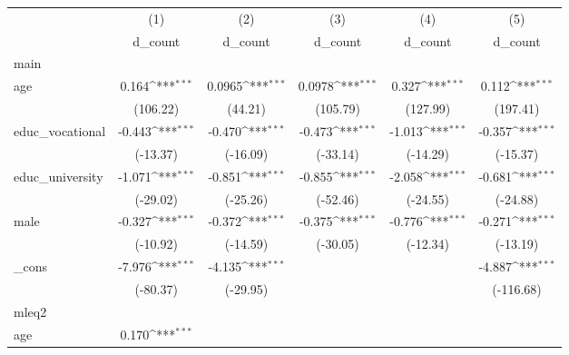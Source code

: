 {
\def\sym#1{\ifmmode^{#1}\else\(^{#1}\)\fi}
\begin{tabular}{l*{5}{c}}
\hline\hline
            &\multicolumn{1}{c}{(1)}&\multicolumn{1}{c}{(2)}&\multicolumn{1}{c}{(3)}&\multicolumn{1}{c}{(4)}&\multicolumn{1}{c}{(5)}\\
            &\multicolumn{1}{c}{d\_count}&\multicolumn{1}{c}{d\_count}&\multicolumn{1}{c}{d\_count}&\multicolumn{1}{c}{d\_count}&\multicolumn{1}{c}{d\_count}\\
\hline
main        &                     &                     &                     &                     &                     \\
age         &       0.164\sym{***}&      0.0965\sym{***}&      0.0978\sym{***}&       0.327\sym{***}&       0.112\sym{***}\\
            &    (106.22)         &     (44.21)         &    (105.79)         &    (127.99)         &    (197.41)         \\
[1em]
educ\_vocational&      -0.443\sym{***}&      -0.470\sym{***}&      -0.473\sym{***}&      -1.013\sym{***}&      -0.357\sym{***}\\
            &    (-13.37)         &    (-16.09)         &    (-33.14)         &    (-14.29)         &    (-15.37)         \\
[1em]
educ\_university&      -1.071\sym{***}&      -0.851\sym{***}&      -0.855\sym{***}&      -2.058\sym{***}&      -0.681\sym{***}\\
            &    (-29.02)         &    (-25.26)         &    (-52.46)         &    (-24.55)         &    (-24.88)         \\
[1em]
male        &      -0.327\sym{***}&      -0.372\sym{***}&      -0.375\sym{***}&      -0.776\sym{***}&      -0.271\sym{***}\\
            &    (-10.92)         &    (-14.59)         &    (-30.05)         &    (-12.34)         &    (-13.19)         \\
[1em]
\_cons      &      -7.976\sym{***}&      -4.135\sym{***}&                     &                     &      -4.887\sym{***}\\
            &    (-80.37)         &    (-29.95)         &                     &                     &   (-116.68)         \\
\hline
mleq2       &                     &                     &                     &                     &                     \\
age         &       0.170\sym{***}&                     &                     &                     &                     \\

\end{tabular}}
